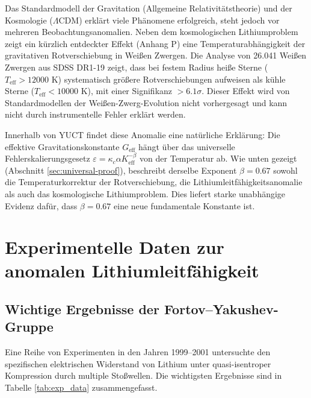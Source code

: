 \documentclass[12pt,a4paper]{article}
\theoremstyle{remark}
\newcommand{\Ke}{K_{\mathrm{eff}}}
\newcommand{\kappac}{\kappa_c}
\newcommand{\alp}{\alpha}
\begin{document}
	Das Standardmodell der Gravitation (Allgemeine Relativitätstheorie) und der Kosmologie (\(\Lambda\)CDM) erklärt viele Phänomene erfolgreich, steht jedoch vor mehreren Beobachtungsanomalien. Neben dem kosmologischen Lithiumproblem zeigt ein kürzlich entdeckter Effekt (Anhang P) eine Temperaturabhängigkeit der gravitativen Rotverschiebung in Weißen Zwergen. Die Analyse von 26.041 Weißen Zwergen aus SDSS DR1-19 \cite{Crumpler2024} zeigt, dass bei festem Radius heiße Sterne (\(T_{\mathrm{eff}} > 12000\) K) systematisch größere Rotverschiebungen aufweisen als kühle Sterne (\(T_{\mathrm{eff}} < 10000\) K), mit einer Signifikanz \(>6.1\sigma\). Dieser Effekt wird von Standardmodellen der Weißen-Zwerg-Evolution nicht vorhergesagt und kann nicht durch instrumentelle Fehler erklärt werden.
	
	Innerhalb von YUCT findet diese Anomalie eine natürliche Erklärung: Die effektive Gravitationskonstante \(G_{\mathrm{eff}}\) hängt über das universelle Fehlerskalierungsgesetz \(\varepsilon = \kappac \alp \Ke^{-\beta}\) von der Temperatur ab. Wie unten gezeigt (Abschnitt \ref{sec:universal-proof}), beschreibt derselbe Exponent \(\beta = 0.67\) sowohl die Temperaturkorrektur der Rotverschiebung, die Lithiumleitfähigkeitsanomalie als auch das kosmologische Lithiumproblem. Dies liefert starke unabhängige Evidenz dafür, dass \(\beta = 0.67\) eine neue fundamentale Konstante ist.
	
	\section{Experimentelle Daten zur anomalen Lithiumleitfähigkeit}
	
	\subsection{Wichtige Ergebnisse der Fortov–Yakushev-Gruppe}
	
	Eine Reihe von Experimenten in den Jahren 1999–2001 \cite{fortov1999, fortov2001, yakushev2002} untersuchte den spezifischen elektrischen Widerstand von Lithium unter quasi-isentroper Kompression durch multiple Stoßwellen. Die wichtigsten Ergebnisse sind in Tabelle \ref{tab:exp_data} zusammengefasst.
	
\end{document}

